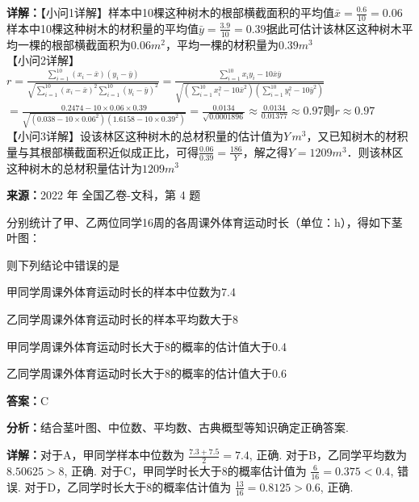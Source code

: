 \begin{question}[points=12]
\begin{solution}
\textbf{详解：}【小问1详解】样本中10棵这种树木的根部横截面积的平均值$\bar{x} = \frac{0.6}{10} = 0.06$样本中10棵这种树木的材积量的平均值$\bar{y} = \frac{3.9}{10} = 0.39$据此可估计该林区这种树木平均一棵的根部横截面积为$0.06m^2$，平均一棵的材积量为$0.39m^3$\\【小问2详解】\\$r = \frac{\sum\limits_{i=1}^{10} (x_i-\bar{x})(y_i-\bar{y})}{\sqrt{\sum\limits_{i=1}^{10} (x_i-\bar{x})^2 \sum\limits_{i=1}^{10} (y_i-\bar{y})^2}} = \frac{\sum\limits_{i=1}^{10} x_i y_i - 10\bar{x}\bar{y}}{\sqrt{(\sum\limits_{i=1}^{10} x_i^2 - 10\bar{x}^2)(\sum\limits_{i=1}^{10} y_i^2 - 10\bar{y}^2)}}$\\$= \frac{0.2474 - 10\times0.06\times0.39}{\sqrt{(0.038 - 10\times0.06^2)(1.6158 - 10\times0.39^2)}} = \frac{0.0134}{\sqrt{0.0001896}} \approx \frac{0.0134}{0.01377} \approx 0.97$则$r \approx 0.97$\\【小问3详解】设该林区这种树木的总材积量的估计值为$Y\,m^3$，又已知树木的材积量与其根部横截面积近似成正比，可得$\frac{0.06}{0.39} = \frac{186}{Y}$，解之得$Y=1209m^3$．则该林区这种树木的总材积量估计为$1209m^3$
\end{solution}
\end{question}

\begin{question}[points=5]
\textbf{来源：}2022 年 全国乙卷-文科，第 4 题\par
分别统计了甲、乙两位同学16周的各周课外体育运动时长（单位：h），得如下茎叶图：



则下列结论中错误的是
\begin{choices}
  \item 甲同学周课外体育运动时长的样本中位数为7.4
  \item 乙同学周课外体育运动时长的样本平均数大于8
  \item 甲同学周课外体育运动时长大于8的概率的估计值大于0.4
  \item 乙同学周课外体育运动时长大于8的概率的估计值大于0.6
\end{choices}
\begin{solution}
\textbf{答案：}C

\textbf{分析：}结合茎叶图、中位数、平均数、古典概型等知识确定正确答案.

\textbf{详解：}对于A，甲同学样本中位数为 $\frac{7.3+7.5}{2}=7.4$, 正确. 对于B，乙同学平均数为 $8.50625>8$, 正确. 对于C，甲同学时长大于8的概率估计值为 $\frac{6}{16}=0.375<0.4$, 错误. 对于D，乙同学时长大于8的概率估计值为 $\frac{13}{16}=0.8125>0.6$, 正确.
\end{solution}
\end{question}

